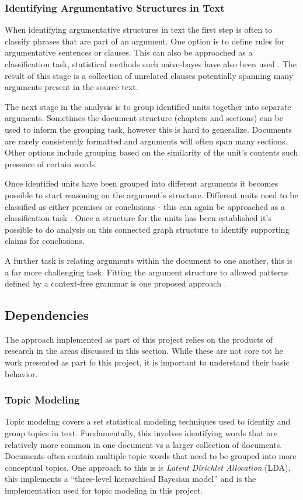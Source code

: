       \subsubsection{Identifying Argumentative Structures in Text}
        When identifying argumentative structures in text the first step is often to classify phrases that are part of an argument. One option is to define rules for argumentative sentences or clauses. This can also be approached as a classification task, statistical methods such naive-bayes have also been used \cite{palau2009argumentation}. The result of this stage is a collection of unrelated clauses potentially spanning many arguments present in the source text.

        The next stage in the analysis is to group identified units together into separate arguments. Sometimes the document structure (chapters and sections) can be used to inform the grouping task, however this is hard to generalize. Documents are rarely consistently formatted and arguments will often span many sections. Other options include grouping based on the similarity of the unit's contents such presence of certain words. \cite{palau2009argumentation}

        Once identified units have been grouped into different arguments it becomes possible to start reasoning on the argument's structure. Different units need to be classified as either premises or conclusions - this can again be approached as a classification task \cite{palau2009argumentation}. Once a structure for the units has been established it's possible to do analysis on this connected graph structure to identify supporting claims for conclusions.

        A further task is relating arguments within the document to one another, this is a far more challenging task. Fitting the argument structure to allowed patterns defined by a context-free grammar is one proposed approach \cite{palau2009argumentation}.

    \tocless\subsection{Dependencies}
      The approach implemented as part of this project relies on the products of research in the areas discussed in this section. While these are not core tot he work presented as part fo this project, it is important to understand their basic behavior.
      \subsubsection{Topic Modeling}
        Topic modeling covers a set statistical modeling techniques used to identify and group topics in text. Fundamentally, this involves identifying words that are relatively more common in one document vs a larger collection of documents. Documents often contain multiple topic words that need to be grouped into more conceptual topics. One approach to this is is \textit{Latent Dirichlet Allocation} (LDA), this implements a ``three-level hierarchical Bayesian model'' \cite{blei2003latent} and is the implementation used for topic modeling in this project.
